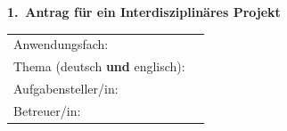 \documentclass[german,11pt,a4paper]{netforms}
\makeatletter
\newcommand{\theassistants}[1][]{%
	\ifx\@empty#1\@empty
		\tumtutorial@assistants
	\else%
		\csname tumtutorial@assistant#1\endcsname
	\fi%
}
\makeatother
\begin{document}
	\vspace{\baselineskip}
	{\large\textbf{1.\, Antrag f\"ur ein Interdisziplin\"ares Projekt}}\\
	\begin{tabular}{p{8em}l}
		Anwendungsfach:%
		&
		\fbox{%
			\begin{minipage}[c][3ex]{12.8cm}
			\mbox{\theanwendungsfach}
			\end{minipage}
		}\\[1.2ex]

		Thema (deutsch \textbf{und} englisch):%
		&
		\fbox{%
			\begin{minipage}[c][9ex]{12.8cm}
			\mbox{\thetitlegerman}

			\mbox{\thetitleenglish}
			\end{minipage}
		}\\[4.3ex]

		Aufgabensteller/in:%
		&
		\fbox{%
			\begin{minipage}[c][3ex]{12.8cm}
			\mbox{\thesupervisor}
			\end{minipage}
		}\\[1.3ex]

		Betreuer/in:%
		&
		\fbox{%
			\begin{minipage}[c][3ex]{12.8cm}
			\mbox{\theassistants}
			\end{minipage}
		}
	\end{tabular}

	\vspace{.5\baselineskip}
	
	
	
\end{document}
